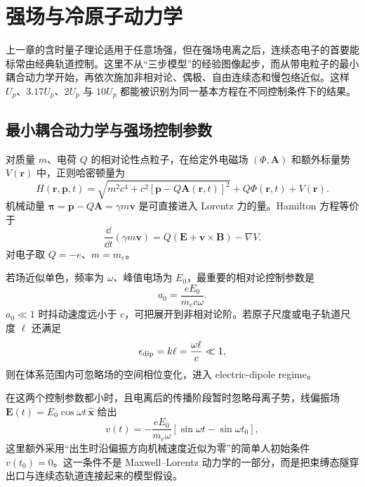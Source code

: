 \chapter{强场与冷原子动力学}
\label{ch:strong-field-classical}

上一章的含时量子理论适用于任意场强，但在强场电离之后，连续态电子的首要能标常由经典轨道控制。这里不从“三步模型”的经验图像起步，而从带电粒子的最小耦合动力学开始，再依次施加非相对论、偶极、自由连续态和慢包络近似。这样 $U_p$、$3.17U_p$、$2U_p$ 与 $10U_p$ 都能被识别为同一基本方程在不同控制条件下的结果。
\section{最小耦合动力学与强场控制参数}

对质量 $m$、电荷 $Q$ 的相对论性点粒子，在给定外电磁场 $(\Phi,\mathbf A)$ 和额外标量势 $V(\mathbf r)$ 中，正则哈密顿量为
\begin{equation}
H(\mathbf r,\mathbf p,t)
=\sqrt{m^2c^4+c^2[\mathbf p-Q\mathbf A(\mathbf r,t)]^2}
+Q\Phi(\mathbf r,t)+V(\mathbf r).
\label{eq:strong-relativistic-hamiltonian}
\end{equation}
机械动量 $\boldsymbol\pi=\mathbf p-Q\mathbf A=\gamma m\mathbf v$ 是可直接进入 Lorentz 力的量。Hamilton 方程等价于
\begin{equation}
\frac{\dd}{\dd t}(\gamma m\mathbf v)
=Q(\mathbf E+\mathbf v\times\mathbf B)-\nabla V.
\label{eq:strong-lorentz-equation}
\end{equation}
对电子取 $Q=-e$、$m=m_e$。

若场近似单色，频率为 $\omega$、峰值电场为 $E_0$，最重要的相对论控制参数是
\begin{equation}
a_0=\frac{eE_0}{m_ec\omega}.
\label{eq:strong-a0}
\end{equation}
$a_0\ll1$ 时抖动速度远小于 $c$，可把展开到非相对论阶。若原子尺度或电子轨道尺度 $\ell$ 还满足
\begin{equation}
\epsilon_{\rm dip}=k\ell=\frac{\omega\ell}{c}\ll1,
\label{eq:strong-dipole-parameter}
\end{equation}
则在体系范围内可忽略场的空间相位变化，进入 electric-dipole regime。

在这两个控制参数都小时，且电离后的传播阶段暂时忽略母离子势，线偏振场 $\mathbf E(t)=E_0\cos\omega t\,\hat{\mathbf x}$ 给出
\begin{equation}
v(t)
=-\frac{eE_0}{m_e\omega}
[\sin\omega t-\sin\omega t_0],
\label{eq:strong-simpleman-velocity}
\end{equation}
这里额外采用“出生时沿偏振方向机械速度近似为零”的简单人初始条件 $v(t_0)=0$。这一条件不是 Maxwell--Lorentz 动力学的一部分，而是把束缚态隧穿出口与连续态轨道连接起来的模型假设。

